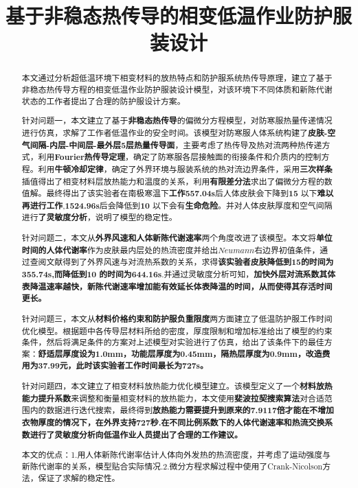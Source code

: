\documentclass{whutmod}
\title{基于非稳态热传导的相变低温作业防护服装设计}
\begin{document}
\maketitle
\begin{abstract}
	本文通过分析超低温环境下相变材料的放热特点和防护服系统热传导原理，建立了基于非稳态热传导方程的相变低温作业防护服装设计模型，对该环境下不同体质和新陈代谢状态的工作者提出了合理的防护服设计方案。
		
	针对问题一，本文建立了基于\textbf{非稳态热传导}的偏微分方程模型，对防寒服热量传递情况进行仿真，求解了工作者低温作业的安全时间。该模型对防寒服人体系统构建了\textbf{皮肤-空气间隔-内层-中间层-最外层5层热量传导面}，主要考虑了热传导及热对流两种热传递方式，利用\textbf{Fourier热传导定理}，确定了防寒服各层接触面的衔接条件和介质内的控制方程。利用\textbf{牛顿冷却定律}，确定了外界环境与服装系统的热对流边界条件，采用\textbf{三次样条}插值得出了相变材料层放热能力和温度的关系，利用\textbf{有限差分法}求出了偏微分方程的数值解。最终得出了该实验者在南极寒温下\textbf{工作557.04s}后人体皮肤会下降到\textbf{15} \textcelsius 以下\textbf{难以再进行工作},\textbf{1524.96s}后会降低到\textbf{10} \textcelsius 以下会有\textbf{生命危险}。并对人体皮肤厚度和空气间隔进行\textbf{了灵敏度分析}，说明了模型的稳定性。
	
	针对问题二，本文从\textbf{外界风速和人体新陈代谢速率}两个角度改进了该模型。本文将\textbf{单位时间的人体代谢率}作为皮肤最内层处的热流密度并给出$Neumann$右边界初值条件，通过查阅文献得到了外界风速与对流热系数的关系，求得\textbf{该实验者皮肤降低到15}\textcelsius \textbf{的时间为355.74s,而降低到10} \textcelsius \textbf{的时间为644.16s}.并通过灵敏度分析可知，\textbf{加快外层对流系数其体表降温速率越快，新陈代谢速率增加能有效延长体表降温的时间，从而使得其存活时间更长。}
	
	针对问题三，本文从\textbf{材料价格约束和防护服负重限度}两方面建立了低温防护服工作时间优化模型。根据题中各传导层材料所给的密度，厚度限制和增加标准给出了模型的约束条件，然后将满足条件的方案对上述模型对实验进行了仿真，给出了该条件下的最佳方案：\textbf{舒适层厚度设为1.0mm，功能层厚度为0.45mm，隔热层厚度为0.9mm，改造费用为37.99元，此时该实验者工作时间最长为727s。}
	
	针对问题四，本文建立了相变材料放热能力优化模型建立。该模型定义了一个\textbf{材料放热能力提升系数}来调整和衡量相变材料的放热能力，本文使用\textbf{斐波拉契搜索算法}对合适范围内的数据进行迭代搜索，最终得到\textbf{放热能力需要提升到原来的7.9117倍才能在不增加衣物厚度的情况下，在外界支持727秒.}\textbf{在不同比例系数下的人体代谢速率和热流交换系数进行了灵敏度分析向低温作业人员提出了合理的工作建议。}
	
	本文的优点：1.用人体新陈代谢率估计人体向外发热的热流密度，并考虑了运动强度与新陈代谢率的关系，模型贴合实际情况.2.微分方程求解过程中使用了Crank-Nicolson方法，保证了求解的稳定性。
	
	\end{abstract}
\tableofcontents
\newpage
\end{document}
